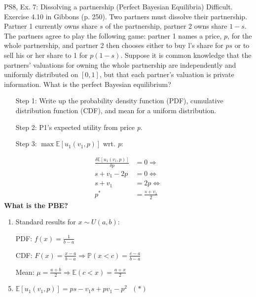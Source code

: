 \begin{frame}{PS8, Ex. 7: Dissolving a partnership (Perfect Bayesian Equilibria)}
    Difficult. Exercise 4.10 in Gibbons (p. 250). Two partners must dissolve their partnership. Partner 1 currently owns share $s$ of the partnership, partner 2 owns share $1-s$. The partners agree to play the following game: partner 1 names a price, $p$, for the whole partnership, and partner 2 then chooses either to buy l's share for $ps$ or to sell his or her share to 1 for $p(1-s)$. Suppose it is common knowledge that the partners' valuations for owning the whole partnership are independently and uniformly distributed on $[0,1]$, but that each partner's valuation is private information. What is the perfect Bayesian equilibrium?\vspace{-11pt}
    \begin{multicols}{2}
      \begin{itemize}
        \item[Step 1:] Write up the probability density function (PDF), cumulative distribution function (CDF), and mean for a uniform distribution.
        \item[Step 2:] P1's expected utility from price \textit{p}.
        \item[Step 3:] $\max\mathbb{E}[u_1(v_1,p)]$ wrt. \textit{p}:
      \end{itemize}\vspace{-6pt}
      \begin{align*}
        \frac{\delta \mathbb{E}[u_1(v_1,p)]}{\delta p}&=0\Rightarrow\\
        s+v_1-2p&=0\Leftrightarrow\\
        s+v_1&=2p\Leftrightarrow\\
        p^*&=\frac{s+v_1}{2}
      \end{align*}
      \textbf{What is the PBE?}
      \vfill\null\columnbreak
      \begin{enumerate}
        \item Standard results for $x\sim U(a, b):$
        \item[PDF:]  $f(x)=\frac{1}{b-a}$
        \item[CDF:]  $F(x)=\frac{x-a}{b-a}\Rightarrow\mathbb{P}(x<c)=\frac{c-a}{b-a}$
        \item[Mean:] $\mu=\frac{a+b}{2}\Rightarrow\mathbb{E}(c<x)=\frac{a+x}{2}$
        \item $\mathbb{E}[u_1(v_1,p)]=ps-v_1s+pv_1-p^2\ \ \ (*)$
      \end{enumerate}
      \vfill\null
    \end{multicols}
\end{frame}
